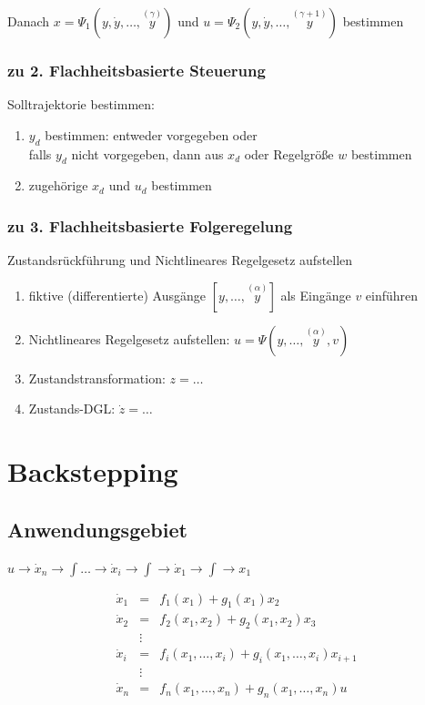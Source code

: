 \documentclass[german]{latex4ei/latex4ei_sheet}
\newcommand{\os}[2]{\ensuremath{\overset{#1}{#2}}}
\begin{document}
\begin{sectionbox}
Danach $x = \Psi_1 (y, \dot{y}, \dots, \os{(\gamma)}{y})$ und $u = \Psi_2 (y, \dot{y}, \dots, \os{(\gamma +1)}{y})$ bestimmen

\subsubsection{zu 2. Flachheitsbasierte Steuerung}

Solltrajektorie bestimmen:
\begin{enumerate}
  \item $y_d$ bestimmen: entweder vorgegeben oder\\
    falls $y_d$ nicht vorgegeben, dann aus $x_d$ oder Regelgröße $w$ bestimmen
  \item zugehörige $x_d$ und $u_d$ bestimmen
\end{enumerate}

\subsubsection{zu 3. Flachheitsbasierte Folgeregelung}
Zustandsrückführung und Nichtlineares Regelgesetz aufstellen
\begin{enumerate}
  \item fiktive (differentierte) Ausgänge $\left[ y, \dots, \os{(\alpha)}{y} \right]$ als Eingänge $v$ einführen
  \item Nichtlineares Regelgesetz aufstellen: $u = \Psi\left( y, \dots, \os{(\alpha)}{y}, v \right)$
  \item Zustandstransformation: $z = \dots$
  \item Zustands-DGL: $\dot{z} = \dots$
\end{enumerate}
\end{sectionbox}

\section{Backstepping}
\begin{sectionbox}
\subsection{Anwendungsgebiet}
$u \rightarrow \dot{x}_n \rightarrow \int \dots \rightarrow \dot{x}_i \rightarrow \int \rightarrow \dot{x}_1 \rightarrow \int \rightarrow x_1$

\begin{align*}
  \dot{x}_1 &=      & f_1(x_1) + g_1(x_1)x_2 \\
  \dot{x}_2 &=      & f_2(x_1, x_2) + g_2(x_1, x_2)x_3 \\
            &\vdots & \\
  \dot{x}_i &=      & f_i(x_1, \dots, x_i) + g_i(x_1, \dots, x_i)x_{i+1} \\
            &\vdots & \\
  \dot{x}_n &=      & f_n(x_1, \dots, x_n) + g_n(x_1, \dots, x_n)u
\end{align*}
\end{sectionbox}
\end{document}
